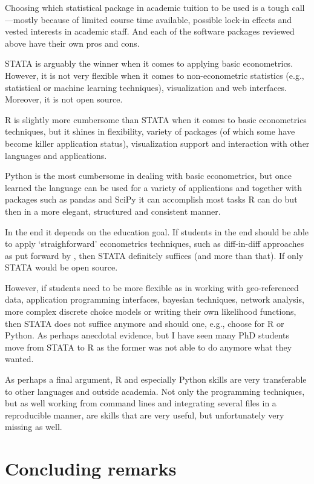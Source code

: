 \documentclass[fleqn,10pt]{SelfArx} %
\begin{document}
Choosing which statistical package in academic tuition to be used is a tough call---mostly because of limited course time available, possible lock-in effects and vested interests in academic staff. And each of the software packages reviewed above have their own pros and cons. 

STATA is arguably the winner when it comes to applying basic econometrics. However, it is not very flexible when it comes to non-econometric statistics (e.g., statistical or machine learning techniques), visualization and web interfaces. Moreover, it is not open source.

R is slightly more cumbersome than STATA when it comes to basic econometrics techniques, but it shines in flexibility, variety of packages (of which some have become killer application status), visualization support and interaction with other languages and applications. 

Python is the most cumbersome in dealing with basic econometrics, but once learned the language can be used for a variety of applications and together with packages such as pandas and SciPy it can accomplish most tasks R can do but then in a more elegant, structured and consistent manner.

In the end it depends on the education goal. If students in the end should be able to apply `straighforward' econometrics techniques, such as diff-in-diff approaches as put forward by \citet{angrist2008mostly}, then STATA definitely suffices (and more than that). If only STATA would be open source.

However, if students need to be more flexible as in working with geo-referenced data, application programming interfaces, bayesian techniques, network analysis, more complex discrete choice models or writing their own likelihood functions, then STATA does not suffice anymore and should one, e.g., choose for R or Python. As perhaps anecdotal evidence, but I have seen many PhD students move from STATA to R as the former was not able to do anymore what they wanted. 

As perhaps a final argument, R and especially Python skills are very transferable to other languages and outside academia. Not only the programming techniques, but as well working from command lines and integrating several files in a reproducible manner, are skills that are very useful, but unfortunately very missing as well.

\section*{Concluding remarks}
\end{document}
